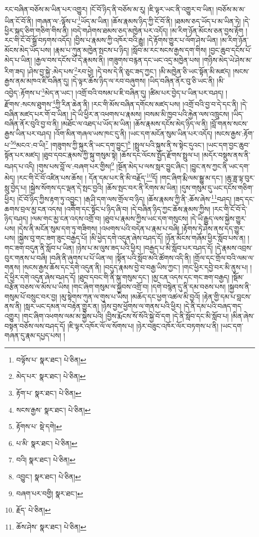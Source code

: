 རང་བཞིན་བཅོས་མ་ཡིན་པར་འགྱུར། །ངོ་བོ་ཉིད་ནི་བཅོས་མ་རུ། །ཇི་ལྟར་ཡང་ནི་འགྱུར་བ་ཡིན། །བཅོས་མ་མ་ཡིན་ངོ་བོ་ནི། །གཞན་ལ་:ལྟོས་པ་\footnote{བལྟོས་པ་  སྣར་ཐང་།  པེ་ཅིན། }ཡོད་མ་ཡིན། །ཆོས་རྣམས་ཉིད་ཀྱི་ངོ་བོ་ནི། །ཐམས་ཅད་ཡོད་པ་མ་ཡིན་ཏེ། །དེ་ཕྱིར་སྐད་ཅིག་གཅིག་གིས་ནི། །བདེ་གཤེགས་ཐམས་ཅད་མཁྱེན་པར་འདོད། །མ་རིག་ཉོན་མོངས་ཅན་བྱས་རྟོག །རང་གི་ངོ་བོ་སྒྲོ་བཏགས་འདོད། །བྱིས་པ་རྣམས་ཀྱི་འཁོར་བའི་རྒྱུ། །དེ་རྟོགས་གྱུར་པ་ལོག་ཤེས་ཡིན། །མ་རིག་ཉོན་མོངས་མེད་ཡོད་པས། །རྣམ་པ་ཀུན་མཁྱེན་སྤངས་པ་ཉིད། །སློབ་མ་རང་སངས་རྒྱས་དག་གིས། །བྱང་ཆུབ་དངོས་པོ་མེད་པ་ཡིན། །རྒྱལ་བས་དངོས་པོ་དེ་རྣམས་ནི། །གཟུགས་བརྙན་དང་ཡང་འདྲ་མཁྱེན་པས། །གཉིས་མེད་ཡེ་ཤེས་མ་རིག་ཟད། །ཤེས་བྱ་སྐྱེ་:མེད་པས་\footnote{མེད་པར་  སྣར་ཐང་།  པེ་ཅིན། }རབ་ཕྱེ། །དེ་བས་དེ་ནི་ཅུང་ཟད་ཀྱང་། །མི་མཁྱེན་ཅི་ཡང་སྟོན་མི་མཛད། །སངས་རྒྱས་ནམ་མཁའ་ཇི་བཞིན་དུ། །དེ་ལྟར་ཆོས་ཉིད་ལ་རབ་བཞུགས། །ཡིད་བཞིན་ནོར་བུ་ཅི་ཡང་ནི། །མི་འབྱེད་:རྟོགས་པ་\footnote{རྟོག་པ་  སྣར་ཐང་།  པེ་ཅིན། }མེད་ན་ཡང་། །འགྲོ་བའི་བསམ་པ་ཇི་བཞིན་དུ། །ཚིམ་པར་བྱེད་པ་ཡིན་པར་བཤད། །རྫོགས་:སངས་ཐུགས་\footnote{སངས་རྒྱས་  སྣར་ཐང་།  པེ་ཅིན། }ཀྱི་རིན་ཆེན་ནི། །རང་གི་མོས་བཞིན་དགོངས་མཛད་པས། །འགྲོ་བའི་བྱ་བ་དེ་དང་ནི། །དེ་བཞིན་མཛད་པར་གོ་བ་ཡིན། །དེ་ཡི་ཕྱིར་ན་འཕགས་པ་རྣམས། །བསམ་མི་ཁྱབ་པའི་རྐྱེན་ལས་འཁྲུངས། །ཡིད་བཞིན་ནོར་བུའི་བྱ་བ་ནི། །མཐོང་ལ་འཐད་པ་ཡོད་མ་ཡིན། །ཆོས་རྣམས་དངོས་མེད་ཉིད་ལ་ནི། །བློ་གནས་སངས་རྒྱས་ཡིན་པར་བཤད། །འོག་མིན་གཞལ་ཡས་ཁང་དུ་ནི། །ཡང་དག་མངོན་སུམ་ཡིན་པར་འདོད། །སངས་རྒྱས་:རྟོག་པ་\footnote{རྟོགས་པ་  སྡེ་དགེ། }\footnote{པ་མི་  སྣར་ཐང་།  པེ་ཅིན། }མངའ་:བ་ཡི།\footnote{བའི།  སྣར་ཐང་།  པེ་ཅིན། } །གཟུགས་ཀྱི་སྐུར་ནི་ཡང་དག་བྱུང་།\footnote{འབྱུང་།  སྣར་ཐང་།  པེ་ཅིན། } །སྤྲུལ་པའི་སྐུས་ནི་ས་སྟེང་དུའང་། །ཡང་དག་བྱང་ཆུབ་སྟོན་པར་མཛད། །ཐུབ་དབང་རྣམས་ཀྱི་སྐུ་གསུམ་སྟེ། །ཆོས་དང་ལོངས་སྤྱོད་རྫོགས་སྤྲུལ་པ། །མདོར་བསྡུས་ནས་ནི་བཤད་པ་འདི། །གུས་པས་བློ་ལ་:བཞག་པར་གྱིས།\footnote{བཞག་པར་བགྱི།  སྣར་ཐང་། } །སྔོན་མེད་པ་ལས་སླར་བྱུང་ཞིང་། །བྱུང་ནས་ཀྱང་ནི་ཡང་དག་མེད། །རང་གི་ངོ་བོ་འཛིན་པས་ཆོས། །
དོན་དམ་པར་ནི་མི་བརྗོད་\footnote{རྗོད་  པེ་ཅིན། }དོ། །གང་ཞིག་རྨི་ལམ་སྒྱུ་མ་དང་། །ཆུ་ཟླ་ལྟ་བུར་སླུ་བྱེད་པ། །སྐྱེས་སོགས་དང་ལྡན་དེ་སྤང་བྱའི། །ཆོས་སྤང་བར་ནི་རིགས་མ་ཡིན། །དུས་གསུམ་དུ་ཡང་དངོས་གཅིག་ཕྱིར། །ངོ་བོ་ཉིད་ཀྱིས་རྟག་ཏུ་འབྱུང་། །རྒ་ཤི་དག་ལས་གྲོལ་བ་ཉིད། །ཆོས་རྣམས་ཀྱི་ནི་:ཆོས་ཞེས་\footnote{ཆོས་ཤེས་  སྣར་ཐང་།  པེ་ཅིན། }བཤད། །ཟད་དང་ཆགས་བྲལ་མྱ་ངན་འདས། །འགོག་དང་སྟོང་པ་ཉིད་ཞི་བ། །དེ་བཞིན་ཉིད་ཀྱང་ཆོས་རྣམས་ཀྱིས། །རང་གི་ངོ་བོ་དེ་ཉིད་བཤད། །ལམ་གང་མྱ་ངན་འདས་འགྲོ་བ། །ཐུབ་པ་རྣམས་ཀྱིས་ཡང་དག་གསུངས། །དེ་ཡི་རྒྱུད་ལས་སྐྱེས་གྱུར་པས། །དེས་ནི་མངོན་སུམ་དག་ཏུ་གཟིགས། །འཕགས་པའི་བདེན་པ་རྣམ་པ་བཞི། །རྟོགས་ཏེ་ཤེས་ནས་དད་གྱུར་པས། །སྐྱེས་བུ་གང་ཟག་ཟུང་བརྒྱད་པོ། །མི་ཕྱེད་དགེ་འདུན་ཞེས་བཤད་དོ། །ཉོན་མོངས་གཞོམ་ཕྱིར་སློབ་པས་ན། །གང་ཟག་བདུན་ནི་སློབ་པ་ཡིན། །ཉེས་པ་མ་ལུས་ཟད་པའི་ཕྱིར། །བརྒྱད་པ་མི་སློབ་པར་བཤད་དོ། །དེ་རྣམས་འབྲས་བུར་གནས་པ་བཞི། །བཞི་ནི་ཞུགས་པ་པོ་ཡིན་ལ། །སྟོན་པའི་སློབ་མའི་ཚོགས་འདི་ནི། །གྲོལ་དང་གྲོལ་བའི་ལམ་ལ་གནས། །སངས་རྒྱས་ཆོས་དང་དགེ་འདུན་ནི། །བདུད་རྣམས་བྱེ་བ་བརྒྱ་ཡིས་ཀྱང་། །གང་ཕྱིར་དབྱེ་བར་མི་ནུས་པ། །དེ་ཕྱིར་དགེ་འདུན་ཞེས་བཤད་དོ། །ཐུབ་དབང་གི་ནི་སྐུ་གསུམ་དང་། །མྱ་ངན་འདས་དང་གང་ཟག་བརྒྱད། །སྡོམ་བརྩོན་བཅས་ལ་མོས་པ་ཡིས། །གང་ཞིག་གསུམ་ལ་སྐྱབས་འགྲོ་བ། །དགེ་བསྙེན་དུ་ནི་དམ་བཅས་པས། །སྐྱབས་ནི་གསུམ་པོ་བསྲུང་བར་བྱ། །མུ་སྟེགས་ཀུན་ལ་གུས་པ་ཡིས། །མཆོད་དང་ཕྱག་འཚལ་མི་བྱའོ། །རྟེན་གྱི་དམ་པ་བླངས་ནས་ནི། །སླར་ཡང་དམན་ལ་བརྟེན་གྱུར་ན། །ཉེས་བྱས་ཕྱོགས་ལ་གནས་པའི་ཕྱིར། །དེ་ནི་དམ་པའི་བཞད་གད་འགྱུར། །གང་ཞིག་འཕགས་ལམ་མ་སྐྱེས་པའི། །བྱིས་རྨོངས་སོ་སོའི་སྐྱེ་བོ་དག །དེ་ནི་སློབ་དང་མི་སློབ་པ། །མིན་ཞེས་བསྟན་བཅོས་ལས་བཤད་དོ། །ཇི་ལྟར་འཁོར་ལོ་ལ་སོགས་པ། །ཉེར་བཟུང་འཁོར་ལོར་བཏགས་པ་ནི། །ཡང་དག་གཞན་དུ་རྣམ་དཔྱད་པས། །
